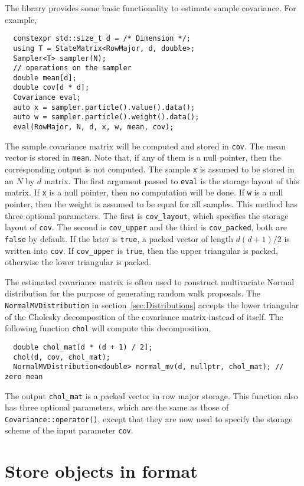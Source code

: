 The library provides some basic functionality to estimate sample covariance.
For example,
\begin{Verbatim}
  constexpr std::size_t d = /* Dimension */;
  using T = StateMatrix<RowMajor, d, double>;
  Sampler<T> sampler(N);
  // operations on the sampler
  double mean[d];
  double cov[d * d];
  Covariance eval;
  auto x = sampler.particle().value().data();
  auto w = sampler.particle().weight().data();
  eval(RowMajor, N, d, x, w, mean, cov);
\end{Verbatim}
The sample covariance matrix will be computed and stored in \verb|cov|. The
mean vector is stored in \verb|mean|. Note that, if any of them is a null
pointer, then the corresponding output is not computed. The sample \verb|x| is
assumed to be stored in an $N$ by $d$ matrix. The first argument passed to
\verb|eval| is the storage layout of this matrix. If \verb|x| is a null
pointer, then no computation will be done. If \verb|w| is a null pointer, then
the weight is assumed to be equal for all samples. This method has three
optional parameters. The first is \verb|cov_layout|, which specifies the
storage layout of \verb|cov|. The second is \verb|cov_upper| and the third is
\verb|cov_packed|, both are \verb|false| by default. If the later is
\verb|true|, a packed vector of length $d(d+1)/2$ is written into
\verb|cov|. If \verb|cov_upper| is \verb|true|, then the upper triangular is
packed, otherwise the lower triangular is packed.

The estimated covariance matrix is often used to construct multivariate Normal
distribution for the purpose of generating random walk proposals. The
\verb|NormalMVDistribution| in section~\ref{sec:Distributions} accepts the
lower triangular of the Cholesky decomposition of the covariance matrix instead
of itself. The following function \verb|chol| will compute this decomposition,
\begin{Verbatim}
  double chol_mat[d * (d + 1) / 2];
  chol(d, cov, chol_mat);
  NormalMVDistribution<double> normal_mv(d, nullptr, chol_mat); // zero mean
\end{Verbatim}
The output \verb|chol_mat| is a packed vector in row major storage. This
function also has three optional parameters, which are the same as those of
\verb|Covariance::operator()|, except that they are now used to specify the
storage scheme of the input parameter \verb|cov|.

\section{Store objects in \protect\hdf format}
\label{sec:Store objects in HDF5 format}

